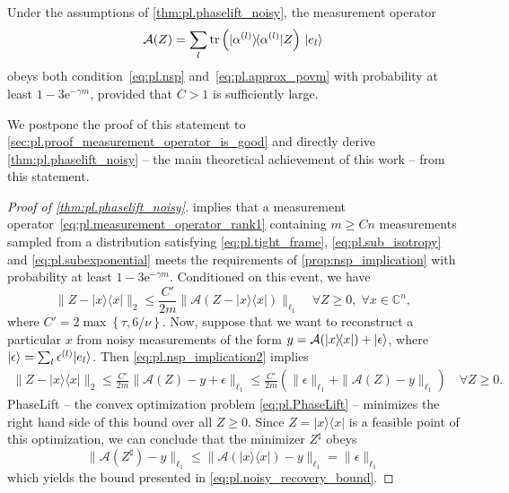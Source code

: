 \begin{proposition} \label{prop:pl.nsp}
  Under the assumptions of \cref{thm:pl.phaselift_noisy}, the measurement operator
  \[
    \label{eq:pl.measurement_operator_rank1}
    \mathcal{A}(Z) = \sum_l \tr \left(\ketbra{\alpha\ind{l}}  Z\right) \, \ket{e_l}
  \]
  obeys both condition~\eqref{eq:pl.nsp} and~\eqref{eq:pl.approx_povm} with probability at least $1- 3\mathrm{e}^{-\gamma m}$, provided that $C >1$ is sufficiently large.
\end{proposition}

We postpone the proof of this statement to \cref{sec:pl.proof_measurement_operator_is_good} and directly derive \cref{thm:pl.phaselift_noisy} -- the main theoretical achievement of this work -- from this statement.

\begin{proof}[Proof of \cref{thm:pl.phaselift_noisy}]
   implies that a measurement operator~\eqref{eq:pl.measurement_operator_rank1} containing $m \geq C n$ measurements sampled from a distribution satisfying \eqref{eq:pl.tight_frame}, \eqref{eq:pl.sub_isotropy} and \eqref{eq:pl.subexponential} meets the requirements of \cref{prop:nsp_implication} with probability at least $1-3 \mathrm{e}^{-\gamma m}$.
  Conditioned on this event, we have
  \[
  \|  Z - |{x} \rangle \! \langle {x}| \|_2 \leq \frac{C'}{2m}  \| \mathcal{A}( Z - |{x} \rangle \! \langle {x}|) \|_{\ell_1} \quad \forall  Z \geq 0,\; \forall {x} \in \mathbb{C}^n,
  \label{eq:pl.nsp_implication2}
  \]
  where $C' = 2 \max \left\{\tau, 6/\nu \right\}$.
  Now, suppose that we want to reconstruct a particular ${x}$ from noisy measurements of the form ${y} = \mathcal{A} (|{x} \rangle \! \langle {x}|) + \ket{\epsilon}$, where $\ket{\epsilon} = \sum_l \epsilon\ind{l} \ket{e_l}$.
  Then \cref{eq:pl.nsp_implication2} implies
  \begin{align}
    \|  Z - |{x} \rangle \! \langle {x}| \|_2 \leq \frac{C'}{2m} \| \mathcal{A}( Z) - {y} + {\epsilon} \|_{\ell_1}
    \leq \frac{C'}{2m} \left( \| {\epsilon} \|_{\ell_1} + \| \mathcal{A}( Z) - {y} \|_{\ell_1} \right)\quad \forall  Z \geq 0.
  \end{align}
  PhaseLift -- the convex optimization problem \eqref{eq:pl.PhaseLift} -- minimizes the right hand side of this bound over all $ Z \geq 0$. Since $ Z = |{x} \rangle \! \langle {x}|$ is a feasible point of this optimization, we can conclude that the minimizer $ Z^\sharp$ obeys
  \[
  \| \mathcal{A}( Z^\sharp) - {y} \|_{\ell_1} \leq \| \mathcal{A}(|{x} \rangle \! \langle {x}|)-{y} \|_{\ell_1} = \| {\epsilon} \|_{\ell_1}
  \]
  which yields the bound presented in \eqref{eq:pl.noisy_recovery_bound}.
\end{proof}


